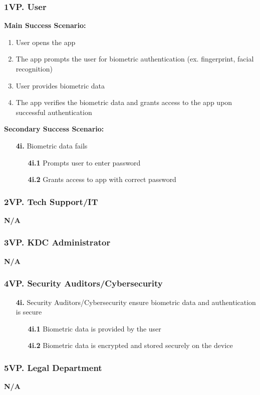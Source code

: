 \documentclass[]{article}
\begin{document}
\subsubsection*{1VP. User}
\textbf{Main Success Scenario:}
\begin{enumerate}
	\item User opens the app
	\item The app prompts the user for biometric authentication (ex. fingerprint, facial recognition)
	\item User provides biometric data
	\item The app verifies the biometric data and grants access to the app upon successful authentication
\end{enumerate}
\textbf{Secondary Success Scenario:}
\begin{enumerate}
	\item[\textbf{4i.}] Biometric data fails
		\begin{enumerate}
			\item[\textbf{4i.1}] Prompts user to enter password
			\item[\textbf{4i.2}] Grants access to app with correct password
		\end{enumerate}
\end{enumerate}
\subsubsection*{2VP. Tech Support/IT}
\textbf{N/A}
\subsubsection*{3VP. KDC Administrator}
\textbf{N/A}
\subsubsection*{4VP. Security Auditors/Cybersecurity}
\begin{enumerate}
	\item[\textbf{4i.}] Security Auditors/Cybersecurity ensure biometric data and authentication is secure
		\begin{enumerate}
			\item[\textbf{4i.1}] Biometric data is provided by the user
			\item[\textbf{4i.2}] Biometric data is encrypted and stored securely on the device
		\end{enumerate}
\end{enumerate}
\subsubsection*{5VP. Legal Department}
\textbf{N/A}
\end{document}
